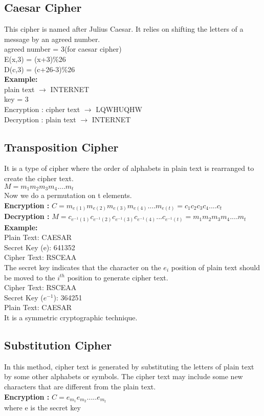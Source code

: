 \documentclass[11pt]{article}
\begin{document}
\subsection{Caesar Cipher}
This cipher is named after Julius Caesar. It relies on shifting the letters of a message by an agreed number.\\
agreed number = 3(for caesar cipher)\\
E(x,3) = (x+3)\%26\\
D(c,3) = (c+26-3)\%26\\
\textbf{Example:}\\
plain text $\rightarrow$ INTERNET\\
key = 3\\
Encryption : cipher text $\rightarrow$ LQWHUQHW\\
Decryption : plain text $\rightarrow$ INTERNET\\
\subsection{Transposition Cipher}
It is a type of cipher where the order of alphabets in plain text is rearranged to create the cipher text.\\
$M = m_1 m_2 m_3 m_4 .... m_t$\\
Now we do a permutation on t elements.\\
\textbf{Encryption :}
$C = m_{e(1)}m_{e(2)}m_{e(3)}m_{e(4)}....m_{e(t)} = c_1 c_2 c_3 c_4 .... c_t$\\
\textbf{Decryption : }
$M = c_{e^{-1}(1)}c_{e^{-1}(2)}c_{e^{-1}(3)}c_{e^{-1}(4)}...c_{e^{-1}(t)} = m_1 m_2 m_3 m_4 .... m_t$\\
\textbf{Example:}\\
    Plain Text: CAESAR\\
    Secret Key (e): 641352\\
    Cipher Text: RSCEAA\\
The secret key indicates that the character on the $e_{i}$ position of plain text should be moved to the $i^{th}$ position to generate cipher text. \\
    Cipher Text: RSCEAA\\
    Secret Key ($e^{-1}$): 364251\\
    Plain Text: CAESAR\\
It is a symmetric cryptographic technique.
\subsection{Substitution Cipher}
In this method, cipher text is generated by substituting the letters of plain text by some other alphabets or symbols. The cipher text may include some new characters that are different from the plain text.\\
\textbf{Encryption :}  $C = e_{m_1}e_{m_2}.....e_{m_t}$ \\
where e is the secret key
\end{document}
